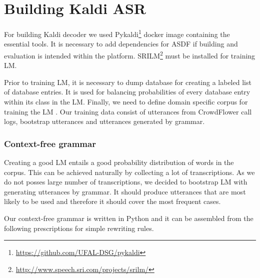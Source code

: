 \section{Building Kaldi ASR}

For building Kaldi decoder we used Pykaldi\footnote{\url{https://github.com/UFAL-DSG/pykaldi}} docker image containing the essential tools.
It is necessary to add dependencies for \ac{ASDF} if building and evaluation is intended within the platform.
\ac{SRILM}\footnote{\url{http://www.speech.sri.com/projects/srilm/}} must be installed for training \acf{LM}.


Prior to training \ac{LM}, it is necessary to dump database for creating a labeled list of database entries. %
It is used for balancing probabilities of every database entry within its class in the \ac{LM}.
Finally, we need to define domain specific corpus for training the \ac{LM} .
Our training data consist of utterances from CrowdFlower call logs, bootstrap utterances and utterances generated by grammar.

\subsubsection{Context-free grammar}

Creating a good \ac{LM} entails a good probability distribution of words in the corpus.
This can be achieved naturally by collecting a lot of transcriptions.
As we do not posses large number of transcriptions, we decided to bootstrap \ac{LM} with generating utterances by grammar.
It should produce utterances that are most likely to be used and therefore it should cover the most frequent cases. %

Our context-free grammar is written in Python and it can be assembled from the following prescriptions for simple rewriting rules.

